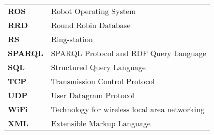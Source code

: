 \begin{tabular}{ll}
\textbf{ROS} &  Robot Operating System \\
\textbf{RRD} &  Round Robin Database \\
\textbf{RS} &  Ring-station \\
\textbf{SPARQL} & SPARQL Protocol and RDF Query Language \\
\textbf{SQL} & Structured Query Language \\
\textbf{TCP} & Transmission Control Protocol \\
\textbf{UDP} & User Datagram Protocol \\
\textbf{WiFi} & Technology for wireless local area networking \\
\textbf{XML} & Extensible Markup Language \\

\end{tabular}

